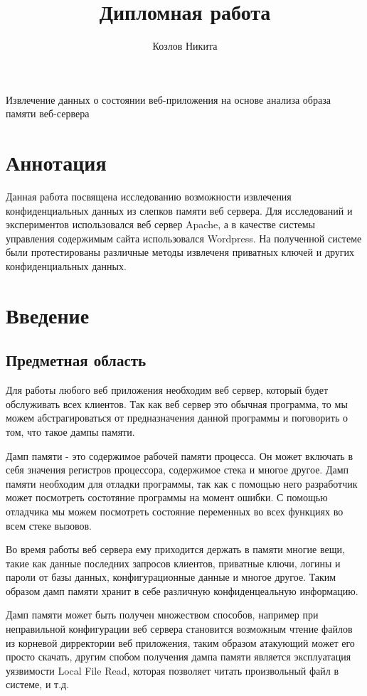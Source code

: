 \documentclass[20pt]{article}
\title{Дипломная работа}
\author{Козлов Никита}
\begin{document}
{\huge Извлечение данных о состоянии веб-приложения на основе анализа образа памяти веб-сервера}

\newpage

\section*{Аннотация}
Данная работа посвящена исследованию возможности извлечения конфиденциальных
данных из слепков памяти веб сервера. Для исследований и экспериментов
использовался веб сервер Apache, а в качестве системы управления содержимым
сайта использовался Wordpress. На полученной системе были протестированы
различные методы извлеченя приватных ключей и других конфиденциальных данных.

\newpage

\tableofcontents

\newpage

\section{Введение}

\subsection{Предметная область}
Для работы любого веб приложения необходим веб сервер, который будет обслуживать
всех клиентов. Так как веб сервер это обычная программа, то мы можем
абстрагироваться от предназначения данной программы и поговорить о том, что такое
дампы памяти.

Дамп памяти - это содержимое рабочей памяти процесса. Он может включать в себя
значения регистров процессора, содержимое стека и многое другое. Дамп памяти
необходим для отладки программы, так как с помощью него разработчик
может посмотреть состотяние программы на момент ошибки. С помощью отладчика мы
можем посмотреть состояние переменных во всех функциях во всем стеке вызовов.

Во время работы веб сервера ему приходится держать в памяти многие вещи, такие
как данные последних запросов клиентов, приватные ключи, логины и пароли от базы
данных, конфигурационные данные и многое другое. Таким образом дамп памяти
хранит в себе различную конфиденцеальную информацию.

Дамп памяти может быть получен множеством способов, например при неправильной
конфигурации веб сервера становится возможным чтение файлов из корневой
дирректории веб приложения, таким образом атакующий может его просто скачать,
другим спобом получения дампа памяти является эксплуатация уязвимости Local File
Read, которая позволяет читать произвольный файл в системе, и т.д.
\end{document}
